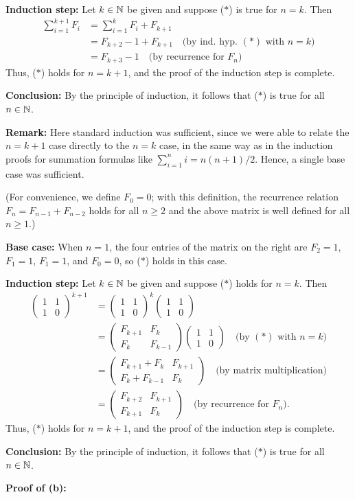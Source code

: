\textbf{Induction step:} Let $k\in\mathbb{N}$ be given and suppose 
($*$) is true for $n=k$. Then
\begin{align*}
\sum_{i=1}^{k+1}F_i
&=
\sum_{i=1}^{k}F_i
+F_{k+1}
\\
&=F_{k+2}-1 + F_{k+1}
\quad \text{(by ind. hyp. $(*)$ with $n=k$)}
\\
&=F_{k+3}-1 
\quad \text{(by recurrence for $F_n$)}
\end{align*}
Thus, ($*$) holds for $n=k+1$, and the proof of the induction step is complete. 

\textbf{Conclusion:} By the principle of induction,  it follows that
($*$) is true for all $n\in\mathbb{N}$.  

\bigskip

\textbf{Remark:} Here standard induction was sufficient, since we were
able to relate the $n=k+1$ case directly to the $n=k$ case, in the
same way as in the induction proofs for summation formulas like 
$\sum_{i=1}^n i=n(n+1)/2$.  Hence, a single base case was sufficient.

(For convenience, we define $F_0=0$; with this definition, the recurrence
relation $F_n=F_{n-1}+F_{n-2}$ holds for all $n\ge2$ and the above matrix
is well defined for all $n\ge1$.)

\textbf{Base case:} When $n=1$, 
the four entries of the matrix on the right are $F_2=1$, $F_1=1$, $F_1=1$, 
and $F_0=0$, so ($*$) holds in this case. 

\newcommand{\mat}[4]{\begin{pmatrix}#1 & #2 \\ #3 & #4\end{pmatrix}}
\textbf{Induction step:} Let $k\in\mathbb{N}$ be given and suppose 
($*$) holds for $n=k$. Then
\begin{align*}
\mat 1110^{k+1}
&=\mat 1110^k\mat1110
\\
&=\mat{F_{k+1}}{F_k}
{F_k}{F_{k-1}}\mat1110
\quad\text{(by $(*)$ with $n=k$)}
\\
&=\mat{F_{k+1}+F_k}{F_{k+1}}{F_{k}+F_{k-1}}{F_k}
\quad \text{(by matrix multiplication)}
\\
&=\mat{F_{k+2}}{F_{k+1}}{F_{k+1}}{F_k}
\quad \text{(by recurrence for $F_n$)}.
\end{align*}
Thus, ($*$) holds for $n=k+1$, and the proof of the induction step is complete. 

\textbf{Conclusion:} By the principle of induction,  it follows that
($*$) is true for all $n\in\mathbb{N}$.  

\textbf{Proof of (b):}

